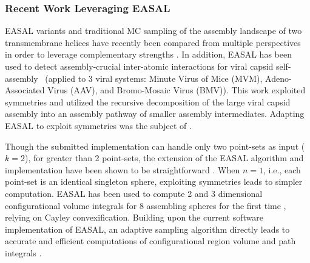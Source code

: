 \subsubsection{Recent Work Leveraging EASAL}
\label{related}
EASAL variants and traditional MC sampling of the assembly landscape of two
transmembrane helices have recently been compared from multiple perspectives in
order to leverage complementary strengths \cite{Ozkan2014MC}. In addition,
EASAL has been used to detect assembly-crucial inter-atomic interactions for
viral capsid self-assembly~\cite{Wu2012,Wu2014Virus} (applied to 3 viral
systems: Minute Virus of Mice (MVM), Adeno-Associated Virus (AAV), and
Bromo-Mosaic Virus (BMV)). This work exploited symmetries and utilized the
recursive decomposition of the large viral capsid assembly into an assembly
pathway of smaller assembly intermediates. Adapting EASAL to exploit symmetries
was the subject of \cite{sym8010005}.


Though the submitted implementation can handle only two point-sets as input
($k=2$), for greater than 2 point-sets, the extension of the EASAL algorithm
and implementation have been shown to be straightforward
\cite{OzSi:2010,Ozkan2014MainEasal}. When $n=1$, i.e., each point-set is an
identical singleton sphere, exploiting symmetries leads to simpler computation.
EASAL has been used to compute 2 and 3 dimensional configurational volume
integrals for 8 assembling spheres for the first time
\cite{Ozkan2014MainEasal}, relying on Cayley convexification. Building upon the
current software implementation of EASAL, an adaptive sampling algorithm
directly leads to accurate and efficient computations of configurational region
volume and path integrals \cite{Ozkan2014Jacobian}.
